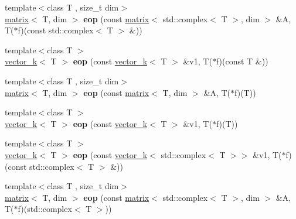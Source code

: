 \begin{DoxyCompactItemize}
\item 
\hypertarget{namespacekeycpp_a0865e2c884915d6ed0e3ef7bf73438b0}{{\footnotesize template$<$class T , size\-\_\-t dim$>$ }\\\hyperlink{classkeycpp_1_1matrix}{matrix}$<$ T, dim $>$ {\bfseries eop} (const \hyperlink{classkeycpp_1_1matrix}{matrix}$<$ std\-::complex$<$ T $>$, dim $>$ \&A, T($\ast$f)(const std\-::complex$<$ T $>$ \&))}\label{namespacekeycpp_a0865e2c884915d6ed0e3ef7bf73438b0}

\item 
\hypertarget{namespacekeycpp_a6c6542964c7aaaccbee336567f64c03c}{{\footnotesize template$<$class T $>$ }\\\hyperlink{classkeycpp_1_1vector__k}{vector\-\_\-k}$<$ T $>$ {\bfseries eop} (const \hyperlink{classkeycpp_1_1vector__k}{vector\-\_\-k}$<$ T $>$ \&v1, T($\ast$f)(const T \&))}\label{namespacekeycpp_a6c6542964c7aaaccbee336567f64c03c}

\item 
\hypertarget{namespacekeycpp_a46e135aeca12d58b9a084413bf571783}{{\footnotesize template$<$class T , size\-\_\-t dim$>$ }\\\hyperlink{classkeycpp_1_1matrix}{matrix}$<$ T, dim $>$ {\bfseries eop} (const \hyperlink{classkeycpp_1_1matrix}{matrix}$<$ T, dim $>$ \&A, T($\ast$f)(T))}\label{namespacekeycpp_a46e135aeca12d58b9a084413bf571783}

\item 
\hypertarget{namespacekeycpp_a48fb1c8a89210ed78554ecd0bed92a59}{{\footnotesize template$<$class T $>$ }\\\hyperlink{classkeycpp_1_1vector__k}{vector\-\_\-k}$<$ T $>$ {\bfseries eop} (const \hyperlink{classkeycpp_1_1vector__k}{vector\-\_\-k}$<$ T $>$ \&v1, T($\ast$f)(T))}\label{namespacekeycpp_a48fb1c8a89210ed78554ecd0bed92a59}

\item 
\hypertarget{namespacekeycpp_afc7610588aa92335352b2796ebdd359d}{{\footnotesize template$<$class T $>$ }\\\hyperlink{classkeycpp_1_1vector__k}{vector\-\_\-k}$<$ T $>$ {\bfseries eop} (const \hyperlink{classkeycpp_1_1vector__k}{vector\-\_\-k}$<$ std\-::complex$<$ T $>$$>$ \&v1, T($\ast$f)(const std\-::complex$<$ T $>$ \&))}\label{namespacekeycpp_afc7610588aa92335352b2796ebdd359d}

\item 
\hypertarget{namespacekeycpp_a2309a6456fab18ec68a436f269d32d8f}{{\footnotesize template$<$class T , size\-\_\-t dim$>$ }\\\hyperlink{classkeycpp_1_1matrix}{matrix}$<$ T, dim $>$ {\bfseries eop} (const \hyperlink{classkeycpp_1_1matrix}{matrix}$<$ std\-::complex$<$ T $>$, dim $>$ \&A, T($\ast$f)(std\-::complex$<$ T $>$))}\label{namespacekeycpp_a2309a6456fab18ec68a436f269d32d8f}


\end{DoxyCompactItemize}
